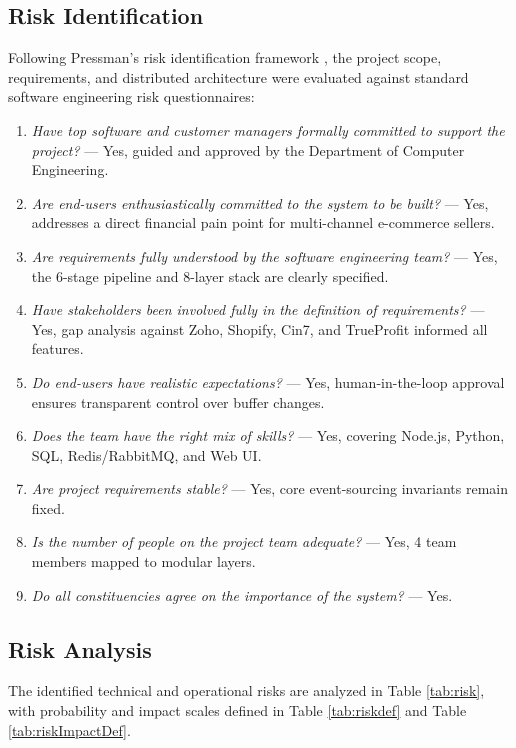 \documentclass[oneside,a4paper,12pt]{report}
\begin{document}
\subsection{Risk Identification}
Following Pressman's risk identification framework \cite{bookPressman}, the project scope, requirements, and distributed architecture were evaluated against standard software engineering risk questionnaires:
\begin{enumerate}
  \item \textit{Have top software and customer managers formally committed to support the project?} — Yes, guided and approved by the Department of Computer Engineering.
  \item \textit{Are end-users enthusiastically committed to the system to be built?} — Yes, addresses a direct financial pain point for multi-channel e-commerce sellers.
  \item \textit{Are requirements fully understood by the software engineering team?} — Yes, the 6-stage pipeline and 8-layer stack are clearly specified.
  \item \textit{Have stakeholders been involved fully in the definition of requirements?} — Yes, gap analysis against Zoho, Shopify, Cin7, and TrueProfit informed all features.
  \item \textit{Do end-users have realistic expectations?} — Yes, human-in-the-loop approval ensures transparent control over buffer changes.
  \item \textit{Does the team have the right mix of skills?} — Yes, covering Node.js, Python, SQL, Redis/RabbitMQ, and Web UI.
  \item \textit{Are project requirements stable?} — Yes, core event-sourcing invariants remain fixed.
  \item \textit{Is the number of people on the project team adequate?} — Yes, 4 team members mapped to modular layers.
  \item \textit{Do all constituencies agree on the importance of the system?} — Yes.
\end{enumerate}

\subsection{Risk Analysis}
The identified technical and operational risks are analyzed in Table \ref{tab:risk}, with probability and impact scales defined in Table \ref{tab:riskdef} and Table \ref{tab:riskImpactDef}.
\end{document}
